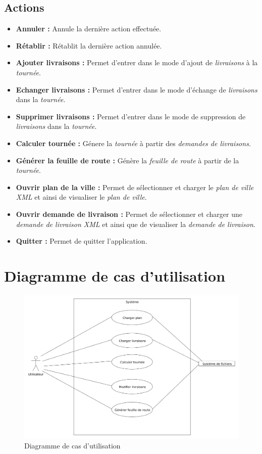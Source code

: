 \documentclass[10pt,a4paper]{book}
\begin{document}
\subsection{Actions}
\begin{itemize}
\item \textbf{Annuler :} Annule la dernière action effectuée. \vskip1mm
\item \textbf{Rétablir :} Rétablit la dernière action annulée. \vskip1mm
\item \textbf{Ajouter livraisons :} Permet d'entrer dans le mode d'ajout de \textit{livraisons} à la \textit{tournée}. \vskip1mm
\item \textbf{Echanger livraisons :} Permet d'entrer dans le mode d'échange de \textit{livraisons} dans la \textit{tournée}. \vskip1mm
\item \textbf{Supprimer livraisons :} Permet d'entrer dans le mode de suppression de \textit{livraisons} dans la \textit{tournée}. \vskip1mm
\item \textbf{Calculer tournée :} Génere la \textit{tournée} à partir des \textit{demandes de livraisons}. \vskip1mm
\item \textbf{Générer la feuille de route :} Génère la \textit{feuille de route} à partir de la \textit{tournée}. \vskip1mm
\item \textbf{Ouvrir plan de la ville :} Permet de sélectionner et charger le \textit{plan de ville XML} et ainsi de visualiser le \textit{plan de ville}. \vskip1mm
\item \textbf{Ouvrir demande de livraison :} Permet de sélectionner et charger une \textit{demande de livraison XML} et ainsi que de visualiser la \textit{demande de livraison}. \vskip1mm
\item \textbf{Quitter :} Permet de quitter l'application. \vskip1mm
\end{itemize}
\section{Diagramme de cas d'utilisation}
\begin{figure}[H]
    \centering
    \includegraphics[scale=0.35]{cu.png}
    \caption{Diagramme de cas d'utilisation}
\end{figure}
\end{document}

